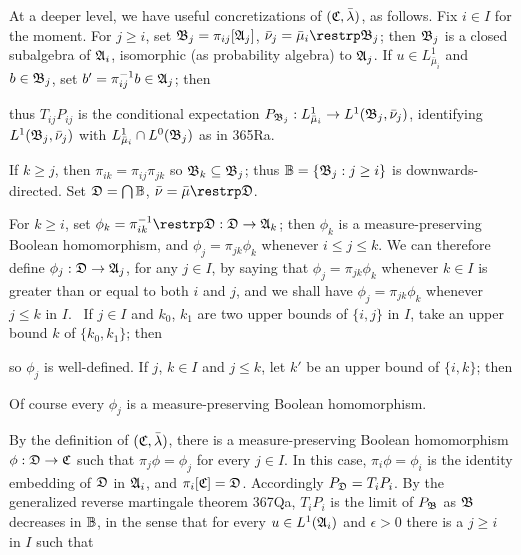 \medskip

At a deeper level, we have useful concretizations of
$(\frak C,\bar\lambda)$, as follows.   Fix $i\in I$ for the moment.
For $j\ge i$, set $\frak B_j=\pi_{ij}[\frak A_j]$,
$\bar\nu_j=\bar\mu_i\restrp\frak B_j$;  then
$\frak B_j$ is a closed subalgebra of $\frak A_i$, isomorphic (as
probability algebra) to $\frak A_j$.   If $u\in L^1_{\bar\mu_i}$ and
$b\in\frak B_j$, set $b'=\pi_{ij}^{-1}b\in\frak A_j$;  then


\noindent thus $T_{ij}P_{ij}$ is the conditional expectation
$P_{\frak B_j}:L^1_{\bar\mu_i}\to L^1(\frak B_j,\bar\nu_j)$,
identifying $L^1(\frak B_j,\bar\nu_j)$ with
$L^1_{\bar\mu_i}\cap L^0(\frak B_j)$ as in 365Ra.

If $k\ge j$, then $\pi_{ik}=\pi_{ij}\pi_{jk}$ so
$\frak B_k\subseteq\frak B_j$;  thus $\Bbb B=\{\frak B_j:j\ge i\}$ is
downwards-directed.   Set $\frak D=\bigcap\Bbb B$,
$\bar\nu=\bar\mu\restrp\frak D$.

For $k\ge i$, set $\phi_k=\pi_{ik}^{-1}\restrp\frak D:\frak D\to\frak A_k$;
then $\phi_k$ is a measure-preserving Boolean homomorphism, and
$\phi_j=\pi_{jk}\phi_k$ whenever $i\le j\le k$.   We can therefore define
$\phi_j:\frak D\to\frak A_j$, for any $j\in I$, by saying that
$\phi_j=\pi_{jk}\phi_k$ whenever $k\in I$ is greater than or equal to both
$i$ and $j$, and we shall have $\phi_j=\pi_{jk}\phi_k$ whenever
$j\le k$ in $I$.   \Prf\ If $j\in I$ and
$k_0$, $k_1$ are two upper bounds of $\{i,j\}$
in $I$, take an upper bound $k$ of $\{k_0,k_1\}$;  then


\noindent so $\phi_j$ is well-defined.   If $j$, $k\in I$ and
$j\le k$, let $k'$ be an upper bound of $\{i,k\}$;  then


\noindent Of course every $\phi_j$ is a measure-preserving Boolean
homomorphism.

By the definition of $(\frak C,\bar\lambda)$, there is a
measure-preserving Boolean homomorphism $\phi:\frak D\to\frak C$ such that
$\pi_j\phi=\phi_j$ for every $j\in I$.   In this case, $\pi_i\phi=\phi_i$
is the identity embedding of $\frak D$ in $\frak A_i$, and
$\pi_i[\frak C]=\frak D$.   Accordingly $P_{\frak D}=T_iP_i$.   By
the generalized reverse martingale theorem 367Qa,
$T_iP_i$ is the limit of $P_{\frak B}$ as $\frak B$ decreases in
$\Bbb B$, in the sense that for every $u\in L^1(\frak A_i)$ and
$\epsilon>0$ there is a $j\ge i$ in $I$ such that

